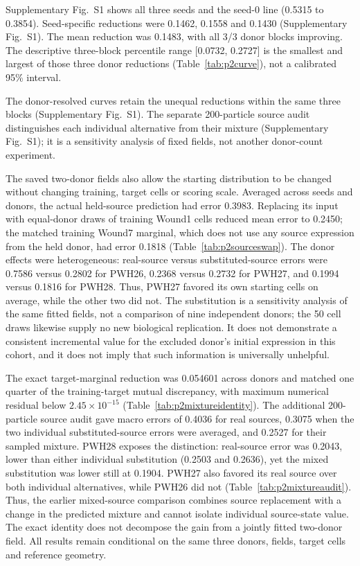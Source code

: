 \documentclass[10pt,a4paper]{article}
\begin{document}
Supplementary Fig.~S1\label{call:p2f6} shows all three seeds and the seed-0 line (0.5315 to 0.3854). Seed-specific reductions were 0.1462, 0.1558 and 0.1430 (Supplementary Fig.~S1). The mean reduction was 0.1483, with all 3/3 donor blocks improving. The descriptive three-block percentile range {[}0.0732, 0.2727{]} is the smallest and largest of those three donor reductions (Table~\ref{tab:p2curve}), not a calibrated 95\% interval.




The donor-resolved curves retain the unequal reductions within the same three blocks (Supplementary Fig.~S1). The separate 200-particle source audit distinguishes each individual alternative from their mixture (Supplementary Fig.~S1); it is a sensitivity analysis of fixed fields, not another donor-count experiment.

The saved two-donor fields also allow the starting distribution to be changed without changing training, target cells or scoring scale. Averaged across seeds and donors, the actual held-source prediction had error 0.3983. Replacing its input with equal-donor draws of training Wound1 cells reduced mean error to 0.2450; the matched training Wound7 marginal, which does not use any source expression from the held donor, had error 0.1818 (Table~\ref{tab:p2sourceswap}). The donor effects were heterogeneous: real-source versus substituted-source errors were 0.7586 versus 0.2802 for PWH26, 0.2368 versus 0.2732 for PWH27, and 0.1994 versus 0.1816 for PWH28. Thus, PWH27 favored its own starting cells on average, while the other two did not. The substitution is a sensitivity analysis of the same fitted fields, not a comparison of nine independent donors; the 50 cell draws likewise supply no new biological replication. It does not demonstrate a consistent incremental value for the excluded donor's initial expression in this cohort, and it does not imply that such information is universally unhelpful.

The exact target-marginal reduction was 0.054601 across donors and matched one quarter of the training-target mutual discrepancy, with maximum numerical residual below $2.45\times10^{-15}$ (Table~\ref{tab:p2mixtureidentity}). The additional 200-particle source audit gave macro errors of 0.4036 for real sources, 0.3075 when the two individual substituted-source errors were averaged, and 0.2527 for their sampled mixture. PWH28 exposes the distinction: real-source error was 0.2043, lower than either individual substitution (0.2503 and 0.2636), yet the mixed substitution was lower still at 0.1904. PWH27 also favored its real source over both individual alternatives, while PWH26 did not (Table~\ref{tab:p2mixtureaudit}). Thus, the earlier mixed-source comparison combines source replacement with a change in the predicted mixture and cannot isolate individual source-state value. The exact identity does not decompose the gain from a jointly fitted two-donor field. All results remain conditional on the same three donors, fields, target cells and reference geometry.
\end{document}
